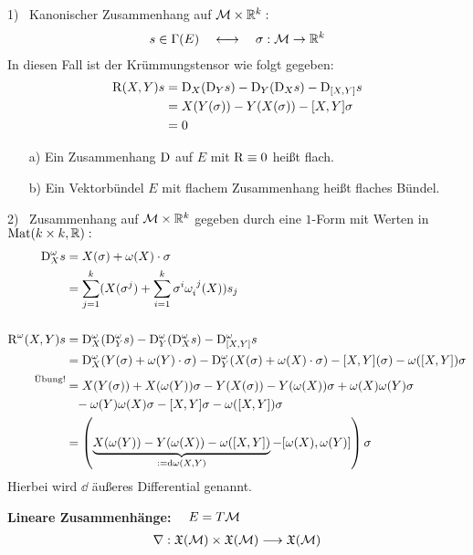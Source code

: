 \begin{bsp}
1) \ Kanonischer Zusammenhang auf $\mathcal{M} \times \mathbb{R}^k:$
\begin{align*}
s \in \Gamma(E) \quad \longleftrightarrow \quad \sigma: \mathcal{M} \rightarrow \mathbb{R}^k 
\end{align*}
In diesen Fall ist der Krümmungstensor wie folgt gegeben:
\begin{align*}
\operatorname{R}(X,Y)s &= \mathrm{D}_X(\mathrm{D}_Ys) - \mathrm{D}_Y(\mathrm{D}_Xs) - \mathrm{D}_{[X,Y]}s \\
			&= X(Y(\sigma)) - Y(X(\sigma)) - [X,Y]\sigma \\
			&= 0
\end{align*}
\end{bsp}

\begin{defs}
\begin{itemize}
	\item[a)] Ein Zusammenhang $\mathrm{D}$ auf $E$ mit $\operatorname{R} \equiv 0$ heißt flach.
	\item[b)] Ein Vektorbündel $E$ mit flachem Zusammenhang heißt flaches Bündel.
\end{itemize}
\end{defs}

\begin{bsp}
2) \ Zusammenhang auf $\mathcal{M} \times \mathbb{R}^k$ gegeben durch eine $1$-Form mit Werten in $\operatorname{Mat}(k \times k,\mathbb{R}):$
\begin{align*}
\mathrm{D}^{\omega}_X s &= X(\sigma) + \omega(X)\cdot\sigma \\
							&= \sum_{j=1}^{k} (X(\sigma^{j}) + \sum_{i=1}^{k} \sigma^{i}\omega_i^{\phantom{i}j}(X))s_j \\
							\phantom{.} \\
\operatorname{R}^{\omega}(X,Y)s &= \mathrm{D}^{\omega}_X(\mathrm{D}^{\omega}_Ys) - \mathrm{D}^{\omega}_Y(\mathrm{D}^{\omega}_Xs) - \mathrm{D}^{\omega}_{[X,Y]}s \\
&= \mathrm{D}^{\omega}_X(Y(\sigma) + \omega(Y)\cdot\sigma) - \mathrm{D}^{\omega}_Y(X(\sigma)+ \omega(X)\cdot\sigma) - [X,Y](\sigma) - \omega([X,Y]) \sigma \\
\overset{\text{Übung!}}{\phantom{=}} &= X(Y(\sigma)) + X(\omega(Y))\sigma - Y(X(\sigma)) - Y(\omega(X))\sigma + \omega(X)\omega(Y)\sigma \\
& \phantom{=} - \omega(Y)\omega(X)\sigma - [X,Y]\sigma - \omega([X,Y])\sigma \\
&= \left( \underbrace{X(\omega(Y)) - Y(\omega(X)) - \omega([X,Y])}_{:= \dd\omega(X,Y)} - [\omega(X),\omega(Y)]\right) \sigma
\end{align*}
Hierbei wird $\dd$ äußeres Differential genannt.
\end{bsp}
\textbf{Lineare Zusammenhänge:} $ \quad E= T\mathcal{M}$ 
\begin{align*}
\nabla: \mathfrak{X}(\mathcal{M}) \times \mathfrak{X}(\mathcal{M}) \longrightarrow \mathfrak{X}(\mathcal{M})
\end{align*}

